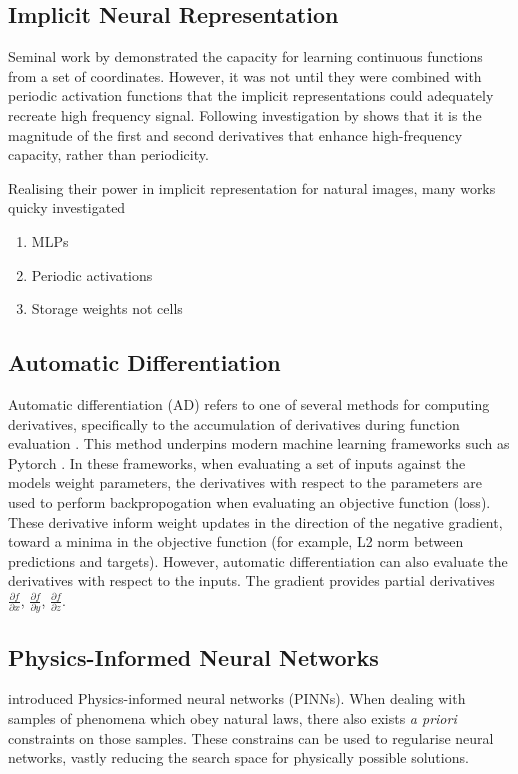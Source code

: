 \documentclass{article}
\begin{document}
\subsection{Implicit Neural Representation}
\label{sec:inr}
Seminal work by \parencite{mildenhallNeRFRepresentingScenes2020} demonstrated the capacity for learning continuous functions from a set of coordinates.
However, it was not until they were combined with periodic activation functions \parencite{sitzmann2019siren} that the implicit representations could adequately recreate high frequency signal.
Following investigation by \parencite{ramasinghePeriodicityUnifyingFramework2022} shows that it is the magnitude of the first and second derivatives that enhance high-frequency capacity, rather than periodicity.

Realising their power in implicit representation for natural images, many works quicky investigated
\begin{enumerate}
    \item MLPs
    \item Periodic activations
    \item Storage weights not cells
\end{enumerate}

\subsection{Automatic Differentiation}
Automatic differentiation (AD) refers to one of several methods for computing derivatives, specifically to the accumulation of derivatives during function evaluation \parencite{baydin2018automatic}.
This method underpins modern machine learning frameworks such as Pytorch \parencite{paszkePyTorchImperativeStyle2019}.
In these frameworks, when evaluating a set of inputs against the models weight parameters, the derivatives with respect to the parameters are used to perform backpropogation when evaluating an objective function (loss).
These derivative inform weight updates in the direction of the negative gradient, toward a minima in the objective function (for example, L2 norm between predictions and targets).
However, automatic differentiation can also evaluate the derivatives with respect to the inputs.
The gradient provides partial derivatives $\frac{\partial f}{\partial x}$, $\frac{\partial f}{\partial y}$, $\frac{\partial f}{\partial z}$.

\subsection{Physics-Informed Neural Networks}
\parencite{raissiPhysicsinformedNeuralNetworks2019} introduced Physics-informed neural networks (PINNs).
When dealing with samples of phenomena which obey natural laws, there also exists \emph{a priori} constraints on those samples.
These constrains can be used to regularise neural networks, vastly reducing the search space for physically possible solutions.
\end{document}
